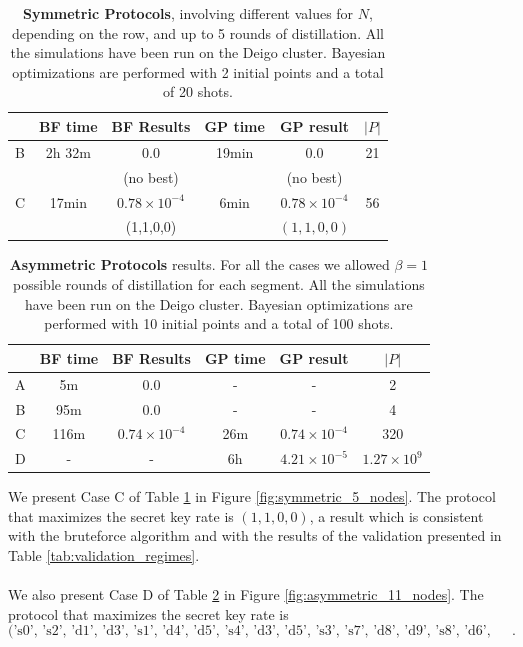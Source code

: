 \documentclass{article}
\begin{document}
\begin{table}[ht]
    \centering
    \begin{tabular}{|c|c|c|c|c|c|}
        \hline
        & BF time & BF Results & GP time & GP result & $|P|$ \\
        \hline
        \hline
        B & 2h 32m & 0.0 & 19min & 0.0 & 21 \\
        & & (no best) & & (no best) & \\
        \hline
        C & 17min & $0.78 \times 10^{-4}$ & 6min & $0.78 \times 10^{-4}$ & 56 \\
        & & (1,1,0,0) & & $(1,1,0,0)$ & \\
        \hline
    \end{tabular}
    \caption{\textbf{Symmetric Protocols}, involving different values for $N$, depending on the row, and up to 5 rounds of distillation. All the simulations have been run on the Deigo cluster. Bayesian optimizations are performed with 2 initial points and a total of 20 shots.}
    \label{tab:symmetric_protocols}
\end{table}

\begin{table}[ht]
    \centering
    \begin{tabular}{|c|c|c|c|c|c|}
        \hline
        & BF time & BF Results & GP time & GP result & $|P|$ \\
        \hline
        \hline
        A & 5m & 0.0 & - & - & 2 \\
        \hline
        B & 95m & 0.0 & - & - & 4 \\
        \hline
        C & 116m & $0.74 \times 10^{-4}$ & 26m & $0.74 \times 10^{-4}$ & 320 \\
        \hline
        D & - & - & 6h & $4.21 \times 10^{-5}$ & $1.27 \times 10^9$ \\
        \hline
    \end{tabular}
    \caption{\textbf{Asymmetric Protocols} results. For all the cases we allowed $\beta=1$ possible rounds of distillation for each segment. All the simulations have been run on the Deigo cluster. Bayesian optimizations are performed with 10 initial points and a total of 100 shots.}
    \label{tab:asymmetric_protocols}
\end{table}

We present Case C of Table \ref{tab:symmetric_protocols} in Figure \ref{fig:symmetric_5_nodes}. The protocol that maximizes the secret key rate is $(1,1,0,0)$, a result which is consistent with the bruteforce algorithm and with the results of the validation presented in Table \ref{tab:validation_regimes}.
\\\\
We also present Case D of Table \ref{tab:asymmetric_protocols} in Figure \ref{fig:asymmetric_11_nodes}. The protocol that maximizes the secret key rate is 
\begin{equation*}
  \text{('s0', 's2', 'd1', 'd3', 's1', 'd4', 'd5', 's4', 'd3', 'd5', 's3', 's7', 'd8', 'd9', 's8', 'd6', 'd9', 's6', 'd5', 'd9', 's5', 'd9')} . 
\end{equation*}
\end{document}
